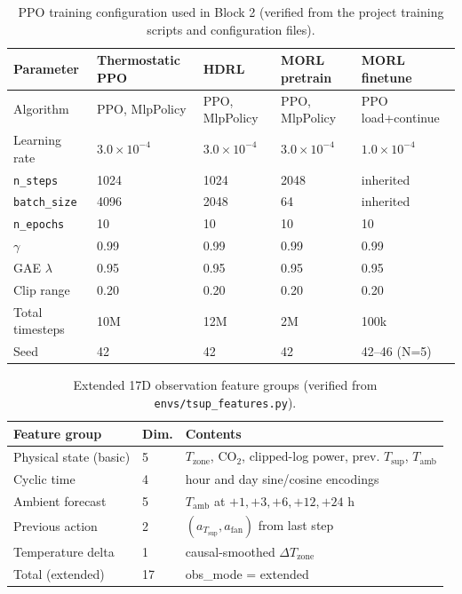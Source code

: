 \documentclass[11pt,a4paper]{article}
\begin{document}
\begin{table}[pos={!ht}]
\centering
\caption{PPO training configuration used in Block 2 (verified from the project training scripts and configuration files).}
\label{tab:ppo_hparams}
\small
\begin{tabular}{lllll}
\toprule
Parameter & Thermostatic PPO & HDRL & MORL pretrain & MORL finetune \\
\midrule
Algorithm & PPO, MlpPolicy & PPO, MlpPolicy & PPO, MlpPolicy & PPO load+continue \\
Learning rate & $3.0{\times}10^{-4}$ & $3.0{\times}10^{-4}$ & $3.0{\times}10^{-4}$ & $1.0{\times}10^{-4}$ \\
\texttt{n\_steps} & 1024 & 1024 & 2048 & inherited \\
\texttt{batch\_size} & 4096 & 2048 & 64 & inherited \\
\texttt{n\_epochs} & 10 & 10 & 10 & 10 \\
$\gamma$ & 0.99 & 0.99 & 0.99 & 0.99 \\
GAE $\lambda$ & 0.95 & 0.95 & 0.95 & 0.95 \\
Clip range & 0.20 & 0.20 & 0.20 & 0.20 \\
Total timesteps & 10M & 12M & 2M & 100k \\
Seed & 42 & 42 & 42 & 42--46 (N=5) \\
\bottomrule
\end{tabular}
\end{table}

\begin{table}[pos={!ht}]
\centering
\caption{Extended 17D observation feature groups (verified from \texttt{envs/tsup\_features.py}).}
\label{tab:obs17}
\small
\begin{tabularx}{\linewidth}{llX}
\toprule
Feature group & Dim. & Contents \\
\midrule
Physical state (basic) & 5 & $T_{\mathrm{zone}}$, CO$_2$, clipped-log power, prev. $T_{\mathrm{sup}}$, $T_{\mathrm{amb}}$ \\
Cyclic time & 4 & hour and day sine/cosine encodings \\
Ambient forecast & 5 & $T_{\mathrm{amb}}$ at $+1,+3,+6,+12,+24$ h \\
Previous action & 2 & $(a_{T_{\mathrm{sup}}}, a_{\mathrm{fan}})$ from last step \\
Temperature delta & 1 & causal-smoothed $\Delta T_{\mathrm{zone}}$ \\
Total (extended) & 17 & obs\_mode = extended \\
\bottomrule
\end{tabularx}
\end{table}
\end{document}
